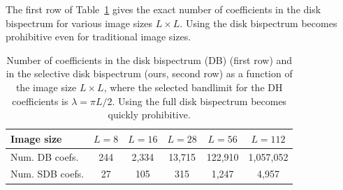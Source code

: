 The first row of Table~\ref{tab:n_coefs} gives the exact number of coefficients in the disk bispectrum for various image sizes $L \times L$. Using the disk bispectrum becomes prohibitive even for traditional image sizes.


\begin{table}[t]
\centering
\footnotesize
\setlength{\tabcolsep}{4.5pt}
\renewcommand{\arraystretch}{1.15}

\begin{tabular}{lccccc}
\toprule
\textbf{Image size} & $L=8$ & $L=16$ & $L=28$ & $L=56$ & $L=112$ \\
\midrule
Num. DB coefs. & 244 & 2,334 & 13,715 & 122,910 & 1,057,052 \\
Num. SDB coefs. & 27 & 105 & 315 & 1,247 & 4,957 \\
\bottomrule
\end{tabular}

\caption{Number of coefficients in the disk bispectrum (DB) (first row) and in the selective disk bispectrum (ours, second row) as a function of the image size $L \times L$, where the selected bandlimit for the DH coefficients is $\lambda = \pi L / 2$. Using the full disk bispectrum becomes quickly prohibitive.}
\label{tab:n_coefs}
\end{table}



